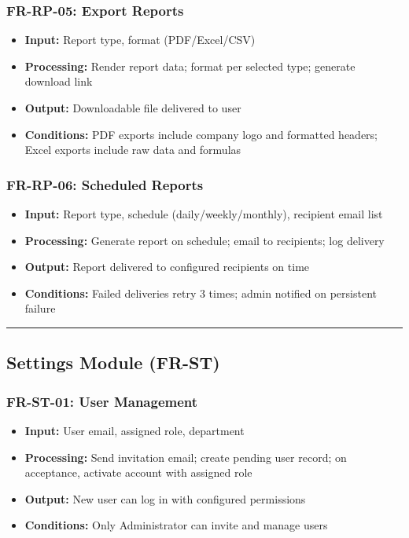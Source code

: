 \documentclass[journal, a4paper, onecolumn, 12pt]{IEEEtran}
\begin{document}
\subsubsection{FR-RP-05: Export Reports}
\begin{itemize}[leftmargin=*]
\item \textbf{Input:} Report type, format (PDF/Excel/CSV)
\item \textbf{Processing:} Render report data; format per selected type; generate download link
\item \textbf{Output:} Downloadable file delivered to user
\item \textbf{Conditions:} PDF exports include company logo and formatted headers; Excel exports include raw data and formulas
\end{itemize}

\subsubsection{FR-RP-06: Scheduled Reports}
\begin{itemize}[leftmargin=*]
\item \textbf{Input:} Report type, schedule (daily/weekly/monthly), recipient email list
\item \textbf{Processing:} Generate report on schedule; email to recipients; log delivery
\item \textbf{Output:} Report delivered to configured recipients on time
\item \textbf{Conditions:} Failed deliveries retry 3 times; admin notified on persistent failure
\end{itemize}

\vspace{1em}\hrule\vspace{1em}

\subsection{Settings Module (FR-ST)}

\subsubsection{FR-ST-01: User Management}
\begin{itemize}[leftmargin=*]
\item \textbf{Input:} User email, assigned role, department
\item \textbf{Processing:} Send invitation email; create pending user record; on acceptance, activate account with assigned role
\item \textbf{Output:} New user can log in with configured permissions
\item \textbf{Conditions:} Only Administrator can invite and manage users
\end{itemize}
\end{document}
